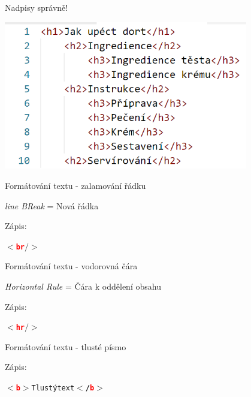 \documentclass[aspectratio=169]{beamer}
\begin{document}
\begin{frame}{Nadpisy správně!}
    \begin{center}
        \includegraphics[width=0.8\textwidth]{img/html-cake.png}
    \end{center}
\end{frame}

\begin{frame}{Formátování textu - zalamování řádku}
    \begin{cardTiny}
        \begin{flushleft}
            \textit{line BReak} = Nová řádka

            Zápis: \begin{alltt}\textbf{$<$\textcolor{red}{br}$ />$}\end{alltt}
        \end{flushleft}
    \end{cardTiny}
\end{frame}

\begin{frame}{Formátování textu - vodorovná čára}
    \begin{cardTiny}
        \begin{flushleft}
            \textit{Horizontal Rule} = Čára k oddělení obsahu 

            Zápis: \begin{alltt}\textbf{$<$\textcolor{red}{hr}$ />$}\end{alltt}
        \end{flushleft}
    \end{cardTiny}
\end{frame}

\begin{frame}{Formátování textu - tlusté písmo}
    \begin{cardTiny}
        \begin{flushleft}
            Zápis: \begin{alltt}\textbf{$<$\textcolor{red}{b}$>$}Tlustý text\textbf{$<$/\textcolor{red}{b}$>$}\end{alltt}
        \end{flushleft}
    \end{cardTiny}
\end{frame}
\end{document}
